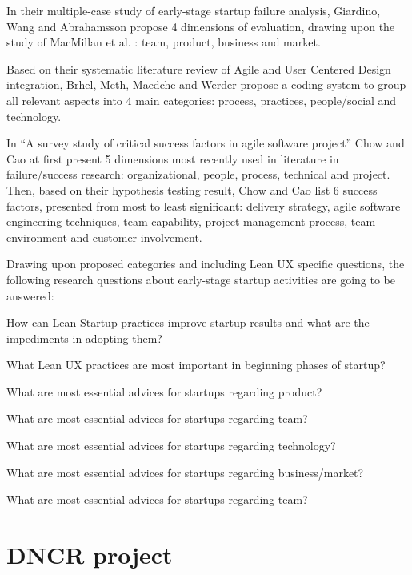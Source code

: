 \documentclass{article}
\begin{document}
In their multiple-case study of early-stage startup failure analysis, Giardino, Wang and Abrahamsson \cite{giardino2014early} propose 4 dimensions of evaluation, drawing upon the study of MacMillan et al. \cite{macmillan1987criteria}: team, product, business and market.

Based on their systematic literature review of Agile and User Centered Design integration, Brhel, Meth, Maedche and Werder \cite{brhel2015exploring} propose a coding system to group all relevant aspects into 4 main categories: process, practices, people/social and technology.

In ``A survey study of critical success factors in agile software project'' Chow and Cao \cite{cao2008agile} at first present 5 dimensions most recently used in literature in failure/success research: organizational, people, process, technical and project. Then, based on their hypothesis testing result, Chow and Cao list 6 success factors, presented from most to least significant: delivery strategy, agile software engineering techniques, team capability, project management process, team environment and customer involvement.

Drawing upon proposed categories and including Lean UX specific questions, the following research questions about early-stage startup activities are going to be answered:

\begin{RQ}
    \item How can Lean Startup practices improve startup results and what are the impediments in adopting them?
    \item What Lean UX practices are most important in beginning phases of startup?
    \item What are most essential advices for startups regarding product?
    \item What are most essential advices for startups regarding team?
    \item What are most essential advices for startups regarding technology?
    \item What are most essential advices for startups regarding business/market?
    \item What are most essential advices for startups regarding team?
\end{RQ}

\section{DNCR project}
\label{sec:dncr-project}
\end{document}
